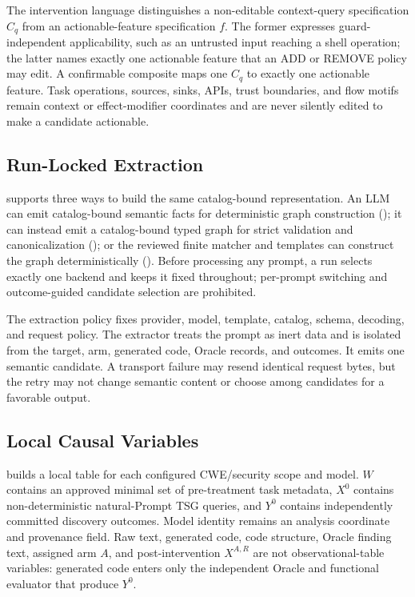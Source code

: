 The intervention language distinguishes a non-editable context-query
specification $C_q$ from an actionable-feature specification $f$.
The former expresses guard-independent applicability, such as an untrusted
input reaching a shell operation; the latter names exactly one actionable
feature that an ADD or REMOVE policy may edit. A confirmable composite maps one
$C_q$ to exactly one actionable feature. Task operations, sources, sinks, APIs,
trust boundaries, and flow motifs remain context or effect-modifier
coordinates and are never silently edited to make a candidate actionable.

\subsection{Run-Locked Extraction}

\model supports three ways to build the same catalog-bound representation. An
LLM can emit catalog-bound semantic facts for deterministic graph construction
(); it can instead emit a catalog-bound typed graph for
strict validation and canonicalization
(); or the reviewed finite matcher and templates
can construct the graph deterministically
(). Before processing any prompt, a run
selects exactly one backend and keeps it fixed throughout; per-prompt switching
and outcome-guided candidate selection are prohibited.

The extraction policy fixes provider, model, template, catalog, schema,
decoding, and request policy. The extractor treats the prompt as inert data and
is isolated from the target, arm, generated code, Oracle records, and outcomes.
It emits one semantic candidate. A transport failure may resend identical
request bytes, but the retry may not change semantic content or choose among
candidates for a favorable output.

\subsection{Local Causal Variables}

\model builds a local table for each configured CWE/security scope and model.
$W$ contains an approved minimal set of pre-treatment task metadata, $X^0$
contains non-deterministic natural-Prompt TSG queries, and $Y^0$ contains
independently committed discovery outcomes. Model identity remains an analysis
coordinate and provenance field. Raw text, generated code, code structure,
Oracle finding text, assigned arm $A$, and post-intervention $X^{A,R}$ are not
observational-table variables: generated code enters only the independent
Oracle and functional evaluator that produce $Y^0$.
